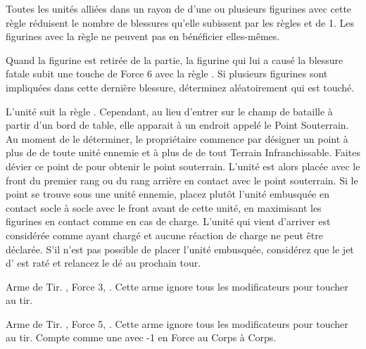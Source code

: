 Toutes les unités alliées dans un rayon de  d'une ou plusieurs figurines avec cette règle réduisent le nombre de blessures qu'elle subissent par les règles \dusttodust{} et \unstable{} de 1. Les figurines avec la règle \necromanticaura{} ne peuvent pas en bénéficier elles-mêmes.

\armyspecialruleentry{\mummyscurse}

Quand la figurine est retirée de la partie, la figurine qui lui a causé la blessure fatale subit une touche de Force 6 avec la règle . Si plusieurs figurines sont impliquées dans cette dernière blessure, déterminez aléatoirement qui est touché.

\armyspecialruleentry{\undergroundambush}

L'unité suit la règle \ambush{}. Cependant, au lieu d'entrer sur le champ de bataille à partir d'un bord de table, elle apparait à un endroit appelé le Point Souterrain. Au moment de le déterminer, le propriétaire commence par désigner un point à plus de  de toute unité ennemie et à plus de  de tout Terrain Infranchissable. Faites dévier ce point de  pour obtenir le point souterrain. L'unité est alors placée avec le front du premier rang ou du rang arrière en contact avec le point souterrain. Si le point se trouve sous une unité ennemie, placez plutôt l'unité embusquée en contact socle à socle avec le front avant de cette unité, en maximisant les figurines en contact comme en cas de charge. L'unité qui vient d'arriver est considérée comme ayant chargé et aucune réaction de charge ne peut être déclarée. S'il n'est pas possible de placer l'unité embusquée, considérez que le jet d'\ambush{} est raté et relancez le dé au prochain tour.

\closearmyspecialrules









\vspace*{1.5cm}
\startarmyarmoury

\startitemlistonecol

\listitemonecol{\aspenbow} Arme de Tir. , Force 3, \volleyfire{}. Cette arme ignore tous les modificateurs pour toucher au tir.

\listitemonecol{\greataspenbow} Arme de Tir. , Force 5, \volleyfire{}. Cette arme ignore tous les modificateurs pour toucher au tir. Compte comme une \hw{} avec -1 en Force au Corps à Corps.

